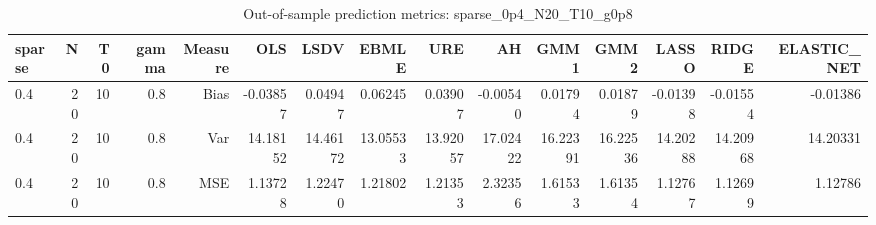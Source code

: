 \begin{table}[!htbp]\centering
\caption{Out-of-sample prediction metrics: sparse_0p4_N20_T10_g0p8}
\label{tab:table3_sparse_0p4_N20_T10_g0p8}
\begin{tabular}{lrrrrrrrrrrrrrr}
\hline
sparse & N & T0 & gamma & Measure & OLS & LSDV & EBMLE & URE & AH & GMM1 & GMM2 & LASSO & RIDGE & ELASTIC_NET \\
\hline
0.4 & 20 & 10 & 0.8 & Bias & -0.03857 & 0.04947 & 0.06245 & 0.03907 & -0.00540 & 0.01794 & 0.01879 & -0.01398 & -0.01554 & -0.01386 \\
0.4 & 20 & 10 & 0.8 & Var & 14.18152 & 14.46172 & 13.05533 & 13.92057 & 17.02422 & 16.22391 & 16.22536 & 14.20288 & 14.20968 & 14.20331 \\
0.4 & 20 & 10 & 0.8 & MSE & 1.13728 & 1.22470 & 1.21802 & 1.21353 & 2.32356 & 1.61533 & 1.61354 & 1.12767 & 1.12699 & 1.12786 \\
\hline
\end{tabular}
\end{table}

